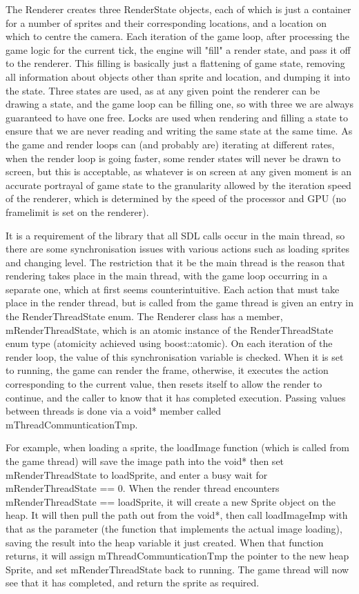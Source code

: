     The Renderer creates three RenderState objects, each of which is just a container for a number of sprites and their corresponding locations, and a location on which to centre the camera.
    Each iteration of the game loop, after processing the game logic for the current tick, the engine will "fill" a render state, and pass it off to the renderer. This filling is basically just a flattening of game state, removing all information about objects other than sprite and location, and dumping it into the state.
    Three states are used, as at any given point the renderer can be drawing a state, and the game loop can be filling one, so with three we are always guaranteed to have one free.
    Locks are used when rendering and filling a state to ensure that we are never reading and writing the same state at the same time.
    As the game and render loops can (and probably are) iterating at different rates, when the render loop is going faster, some render states will never be drawn to screen, but this is acceptable, as whatever is on screen at any given moment is an accurate portrayal of game state to the granularity allowed by the iteration speed of the renderer, which is determined by the speed of the processor and GPU (no framelimit is set on the renderer).
    
    \mbox{}
    
    It is a requirement of the library that all SDL calls occur in the main thread, so there are some synchronisation issues with various actions such as loading sprites and changing level. The restriction that it be the main thread is the reason that rendering takes place in the main thread, with the game loop occurring in a separate one, which at first seems counterintuitive.
    Each action that must take place in the render thread, but is called from the game thread is given an entry in the RenderThreadState enum. The Renderer class has a member, mRenderThreadState, which is an atomic instance of the RenderThreadState enum type (atomicity achieved using boost::atomic). On each iteration of the render loop, the value of this synchronisation variable is checked. When it is set to running, the game can render the frame, otherwise, it executes the action corresponding to the current value, then resets itself to allow the render to continue, and the caller to know that it has completed execution. Passing values between threads is done via a void* member called mThreadCommunticationTmp.
    
    For example, when loading a sprite, the loadImage function (which is called from the game thread) will save the image path into the void* then set mRenderThreadState to loadSprite, and enter a busy wait for mRenderThreadState == 0.
    When the render thread encounters mRenderThreadState == loadSprite, it will create a new Sprite object on the heap. It will then pull the path out from  the void*, then call loadImageImp with that as the parameter (the function that implements the actual image loading), saving the result into the heap variable it just created.
    When that function returns, it will assign mThreadCommunticationTmp the pointer to the new heap Sprite, and set mRenderThreadState back to running.
    The game thread will now see that it has completed, and return the sprite as required.
        
